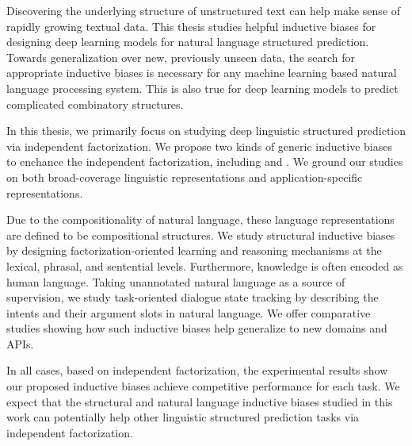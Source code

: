 
Discovering the underlying structure of unstructured text can help
make sense of rapidly growing textual data. This thesis studies
helpful inductive biases for designing deep learning models for
natural language structured prediction. Towards generalization over
new, previously unseen data, the search for appropriate inductive
biases is necessary for any machine learning based natural language
processing system. This is also true for deep learning models to
predict complicated combinatory structures.

In this thesis, we primarily focus on studying deep linguistic
structured prediction via independent factorization. We propose two
kinds of generic inductive biases to enchance the independent
factorization, including  and
.  We ground our studies on
both broad-coverage linguistic representations and
application-specific representations.

Due to the compositionality of natural language, these language
representations are defined to be compositional structures. We study
structural inductive biases by designing factorization-oriented
learning and reasoning mechanisms at the lexical, phrasal, and
sentential levels. Furthermore, knowledge is often encoded as human
language. Taking unannotated natural language as a source of
supervision, we study task-oriented dialogue state tracking by
describing the intents and their argument slots in natural
language. We offer comparative studies showing how such inductive
biases help generalize to new domains and APIs.

In all cases, based on independent factorization, the experimental
results show our proposed inductive biases achieve competitive
performance for each task. We expect that the structural and natural
language inductive biases studied in this work can potentially help
other linguistic structured prediction tasks via independent
factorization.

